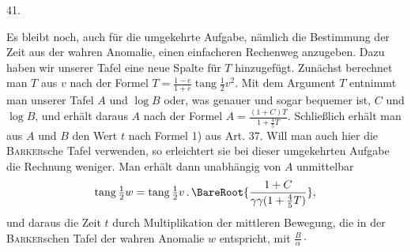 \par{}
\begin{center}
\hypertarget{native-059-article041}{}41.
\end{center}
Es bleibt noch, auch für die umgekehrte Aufgabe, nämlich die Bestimmung der Zeit aus der wahren Anomalie, einen einfacheren Rechenweg anzugeben. Dazu haben wir unserer Tafel eine neue Spalte für $T$ hinzugefügt. Zunächst berechnet man $T$ aus $v$ nach der Formel $T=\frac{1-e}{1+e}\operatorname{tang}\tfrac{1}{2}v^2$. Mit dem Argument $T$ entnimmt man unserer Tafel $A$ und $\log B$ oder, was genauer und sogar bequemer ist, $C$ und $\log B$, und erhält daraus $A$ nach der Formel $A=\frac{(1+C)T}{1+\frac{4}{5}T}$. Schließlich erhält man aus $A$ und $B$ den Wert $t$ nach Formel 1) aus Art. 37. Will man auch hier die \textsc{Barker}sche Tafel verwenden, so erleichtert sie bei dieser umgekehrten Aufgabe die Rechnung weniger. Man erhält dann unabhängig von $A$ unmittelbar
\[
\operatorname{tang}\tfrac{1}{2}w=\operatorname{tang}\tfrac{1}{2}v\,\mathord{.}\,\BareRoot{\frac{1+C}{\gamma\gamma(1+\frac{4}{5}T)}},
\]
und daraus die Zeit $t$ durch Multiplikation der mittleren Bewegung, die in der \textsc{Barker}schen Tafel der wahren Anomalie $w$ entspricht, mit $\frac{B}{\alpha}\cdot$
